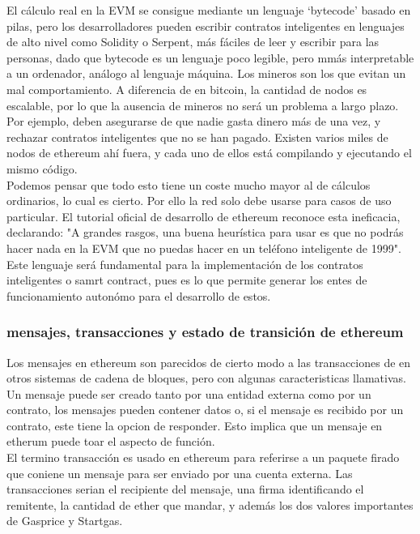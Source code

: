 \documentclass[11pt,a4paper]{article}
\begin{document}
El cálculo real en la EVM se consigue mediante un lenguaje ‘bytecode’ basado en pilas, pero los desarrolladores pueden escribir contratos inteligentes en lenguajes de alto nivel como Solidity o Serpent, más fáciles de leer y escribir para las personas, dado que bytecode es un lenguaje poco legible, pero mmás interpretable a un ordenador, análogo al lenguaje máquina. Los mineros son los que evitan un mal comportamiento. A diferencia de en bitcoin, la cantidad de nodos es escalable, por lo que la ausencia de mineros no será un problema a largo plazo. Por ejemplo, deben asegurarse de que
nadie gasta dinero más de una vez, y rechazar contratos inteligentes que no se han pagado. Existen varios miles de nodos de ethereum ahí fuera, y cada uno de ellos está compilando y ejecutando el mismo código.\\

Podemos pensar que todo esto tiene un coste mucho mayor al de cálculos ordinarios, lo cual es cierto. Por ello la red solo debe usarse para casos de uso particular. El tutorial oficial de desarrollo de ethereum reconoce esta ineficacia, declarando:
"A grandes rasgos, una buena heurística para usar es que no podrás hacer nada en la EVM que no puedas hacer en un teléfono inteligente de 1999".\\

Este lenguaje será fundamental para la implementación de los contratos inteligentes o samrt contract, pues es lo que permite generar los entes de funcionamiento autonómo para el desarrollo de estos.

\subsubsection{mensajes, transacciones y estado de transición de ethereum}

Los mensajes en ethereum son parecidos de cierto modo a las transacciones de en otros  sistemas de cadena de bloques, pero  con algunas caracteristicas llamativas. Un mensaje puede ser creado tanto por una entidad externa como por un contrato, los mensajes pueden contener datos o, si el mensaje es recibido por un contrato, este tiene la opcion de responder. Esto implica que un mensaje en etherum puede toar el aspecto de función.\\

El termino transacción es usado en  ethereum para referirse a un paquete firado que coniene un mensaje para ser enviado por una cuenta externa. Las transacciones serian el recipiente del mensaje, una firma identificando el remitente, la cantidad de ether que mandar, y además los dos valores importantes de Gasprice y Startgas.\\
\end{document}
